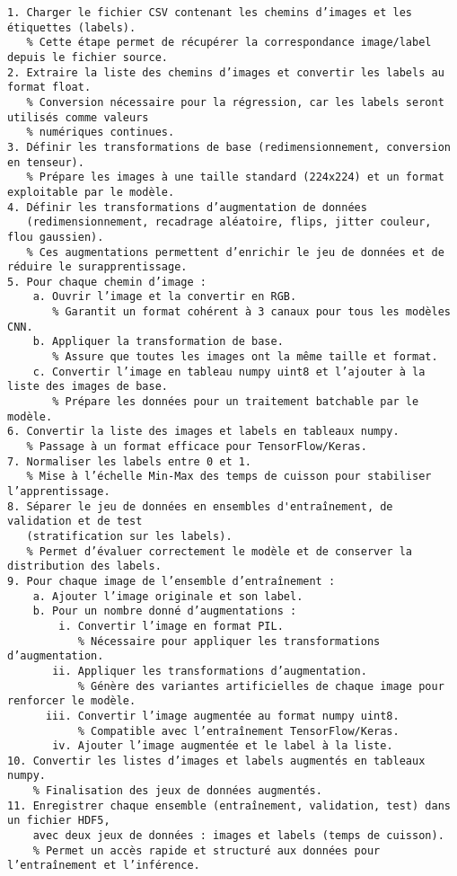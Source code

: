 {\footnotesize
\begin{verbatim}
1. Charger le fichier CSV contenant les chemins d’images et les étiquettes (labels).
   % Cette étape permet de récupérer la correspondance image/label depuis le fichier source.
2. Extraire la liste des chemins d’images et convertir les labels au format float.
   % Conversion nécessaire pour la régression, car les labels seront utilisés comme valeurs 
   % numériques continues.
3. Définir les transformations de base (redimensionnement, conversion en tenseur).
   % Prépare les images à une taille standard (224x224) et un format exploitable par le modèle.
4. Définir les transformations d’augmentation de données 
   (redimensionnement, recadrage aléatoire, flips, jitter couleur, flou gaussien).
   % Ces augmentations permettent d’enrichir le jeu de données et de réduire le surapprentissage.
5. Pour chaque chemin d’image :
    a. Ouvrir l’image et la convertir en RGB.
       % Garantit un format cohérent à 3 canaux pour tous les modèles CNN.
    b. Appliquer la transformation de base.
       % Assure que toutes les images ont la même taille et format.
    c. Convertir l’image en tableau numpy uint8 et l’ajouter à la liste des images de base.
       % Prépare les données pour un traitement batchable par le modèle.
6. Convertir la liste des images et labels en tableaux numpy.
   % Passage à un format efficace pour TensorFlow/Keras.
7. Normaliser les labels entre 0 et 1.
   % Mise à l’échelle Min-Max des temps de cuisson pour stabiliser l’apprentissage.
8. Séparer le jeu de données en ensembles d'entraînement, de validation et de test 
   (stratification sur les labels).
   % Permet d’évaluer correctement le modèle et de conserver la distribution des labels.
9. Pour chaque image de l’ensemble d’entraînement :
    a. Ajouter l’image originale et son label.
    b. Pour un nombre donné d’augmentations :
        i. Convertir l’image en format PIL.
           % Nécessaire pour appliquer les transformations d’augmentation.
       ii. Appliquer les transformations d’augmentation.
           % Génère des variantes artificielles de chaque image pour renforcer le modèle.
      iii. Convertir l’image augmentée au format numpy uint8.
           % Compatible avec l’entraînement TensorFlow/Keras.
       iv. Ajouter l’image augmentée et le label à la liste.
10. Convertir les listes d’images et labels augmentés en tableaux numpy.
    % Finalisation des jeux de données augmentés.
11. Enregistrer chaque ensemble (entraînement, validation, test) dans un fichier HDF5, 
    avec deux jeux de données : images et labels (temps de cuisson).
    % Permet un accès rapide et structuré aux données pour l’entraînement et l’inférence.
\end{verbatim}
}


